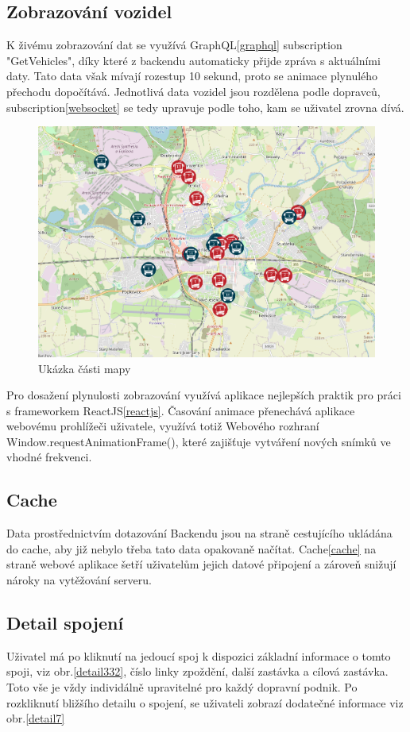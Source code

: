 \subsection{Zobrazování vozidel}
K živému zobrazování dat se využívá GraphQL\ref{graphql} subscription "GetVehicles", díky které z backendu automaticky přijde zpráva s aktuálními daty. Tato data však mívají rozestup 10 sekund, proto se animace plynulého přechodu dopočítává. Jednotlivá data vozidel jsou rozdělena podle dopravců, subscription\ref{websocket} se tedy upravuje podle toho, kam se uživatel zrovna dívá.
\begin{figure}[H]
    \centering
    \includegraphics[width=1\textwidth]{images/Screenshot from 2023-03-18 20-15-00.png}
    \caption{Ukázka části mapy}
    \label{mapa}
\end{figure}

Pro dosažení plynulosti zobrazování využívá aplikace nejlepších praktik pro práci s frameworkem ReactJS\ref{reactjs}. Časování animace přenechává aplikace webovému prohlížeči uživatele, využívá totiž Webového rozhraní Window.requestAnimationFrame()\cite{animationframe}, které zajišťuje vytváření nových snímků ve vhodné frekvenci.
\subsection{Cache}
Data prostřednictvím dotazování Backendu jsou na straně cestujícího ukládána do cache, aby již nebylo třeba tato data opakovaně načítat.
Cache\ref{cache} na straně webové aplikace šetří uživatelům jejich datové připojení a zároveň snižují nároky na vytěžování serveru.

\subsection{Detail spojení}
Uživatel má po kliknutí na jedoucí spoj k dispozici základní informace o tomto spoji, viz obr.\ref{detail332}, číslo linky zpoždění, další zastávka a cílová zastávka. Toto vše je vždy individálně upravitelné pro každý dopravní podnik. Po rozkliknutí bližšího detailu o spojení, se uživateli zobrazí dodatečné informace viz obr.\ref{detail7}


